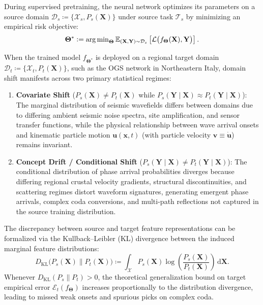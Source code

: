 During supervised pretraining, the neural network optimizes its parameters on a
source domain $\mathcal{D}_s \coloneqq \{\mathcal{X}_s,
P_s(\mathbf{X})\}$ under source
task $\mathcal{T}_s$ by minimizing an empirical risk objective:
\begin{equation}
  \mathbf{\Theta}^* \mathrel{\mathop:}= \operatorname{arg\,min}_{\mathbf{\Theta}} \mathbb{E}_{(\mathbf{X},
  \mathbf{Y}) \sim \mathcal{D}_s}
  \left[ \mathcal{L}\bigl( f_{\mathbf{\Theta}}(\mathbf{X}), \mathbf{Y}
  \bigr) \right].
  \label{eq:source_risk_minimization}
\end{equation}

When the trained model $f_{\bm{\Theta}^*}$ is deployed on a regional target
domain $\mathcal{D}_t \coloneqq \{\mathcal{X}_t, P_t(\mathbf{X})\}$, such as
the \ac{OGS}
network in Northeastern Italy, domain shift manifests across two primary
statistical regimes:
\begin{enumerate}
  \item \textbf{Covariate Shift} ($P_s(\mathbf{X}) \ne P_t(\mathbf{X})$ while
    $P_s(\mathbf{Y} \mid \mathbf{X}) \approx P_t(\mathbf{Y} \mid \mathbf{X})$):
    The marginal distribution of seismic wavefields differs between domains due
    to differing ambient seismic noise spectra, site amplification, and sensor
    transfer functions, while the physical relationship between wave arrival
    onsets and kinematic particle motion $\mathbf{u}(\mathbf{x}, t)$
    (with particle velocity $\mathbf{v} \equiv \dot{\mathbf{u}}$)
    remains invariant.
  \item \textbf{Concept Drift / Conditional Shift} ($P_s(\mathbf{Y}
    \mid \mathbf{X}) \ne P_t(\mathbf{Y} \mid \mathbf{X})$): The conditional
    distribution of phase arrival probabilities diverges because differing
    regional crustal velocity gradients, structural discontinuities, and
    scattering regimes distort waveform signatures, generating emergent phase
    arrivals, complex coda conversions, and multi-path reflections not captured
    in the source training distribution.
\end{enumerate}

The discrepancy between source and target feature representations can be
formalized via the Kullback--Leibler (\ac{KL}) divergence between the induced
marginal feature distributions:
\begin{equation}
  D_{\mathrm{KL}}\bigl( P_s(\mathbf{X}) \parallel P_t(\mathbf{X})
  \bigr) \coloneqq
  \int_{\mathcal{X}} P_s(\mathbf{X}) \log\left(
  \frac{P_s(\mathbf{X})}{P_t(\mathbf{X})} \right) \,\mathrm{d}\mathbf{X}.
  \label{eq:kl_divergence}
\end{equation}
Whenever $D_{\mathrm{KL}}(P_s \parallel P_t) > 0$, the theoretical
generalization
bound on target empirical error $\mathcal{E}_t(f_{\bm{\Theta}})$ increases
proportionally to the distribution divergence, leading to missed weak onsets
and spurious picks on complex coda.

